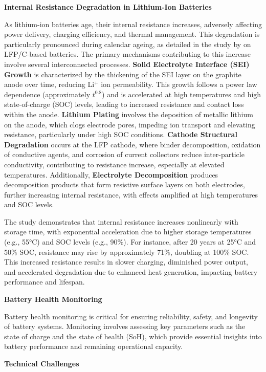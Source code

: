 \textbf{Internal Resistance Degradation in Lithium-Ion Batteries}

As lithium-ion batteries age, their internal resistance increases, adversely affecting power delivery, charging efficiency, and thermal management. This degradation is particularly pronounced during calendar ageing, as detailed in the study by \cite{stroe_degradation_2018} on LFP/C-based batteries. The primary mechanisms contributing to this increase involve several interconnected processes. \textbf{Solid Electrolyte Interface (SEI) Growth} is characterized by the thickening of the SEI layer on the graphite anode over time, reducing Li$^+$ ion permeability. This growth follows a power law dependence (approximately $t^{0.8}$) and is accelerated at high temperatures and high state-of-charge (SOC) levels, leading to increased resistance and contact loss within the anode. \textbf{Lithium Plating} involves the deposition of metallic lithium on the anode, which clogs electrode pores, impeding ion transport and elevating resistance, particularly under high SOC conditions. \textbf{Cathode Structural Degradation} occurs at the LFP cathode, where binder decomposition, oxidation of conductive agents, and corrosion of current collectors reduce inter-particle conductivity, contributing to resistance increase, especially at elevated temperatures. Additionally, \textbf{Electrolyte Decomposition} produces decomposition products that form resistive surface layers on both electrodes, further increasing internal resistance, with effects amplified at high temperatures and SOC levels.

The study demonstrates that internal resistance increases nonlinearly with storage time, with exponential acceleration due to higher storage temperatures (e.g., 55°C) and SOC levels (e.g., 90\%). For instance, after 20 years at 25°C and 50\% SOC, resistance may rise by approximately 71\%, doubling at 100\% SOC. This increased resistance results in slower charging, diminished power output, and accelerated degradation due to enhanced heat generation, impacting battery performance and lifespan.

\textbf{Battery Health Monitoring}

Battery health monitoring is critical for ensuring reliability, safety, and longevity of battery systems. Monitoring involves assessing key parameters such as the state of charge and the state of health (SoH), which provide essential insights into battery performance and remaining operational capacity.

\textbf{Technical Challenges}

